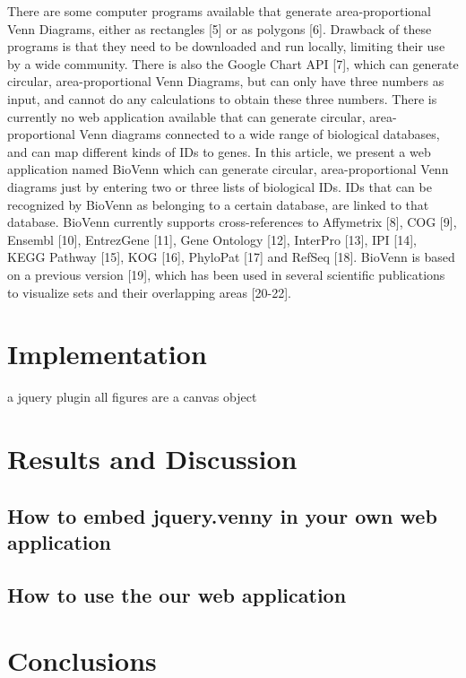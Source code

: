 \documentclass{bmcart}
\begin{document}
There are some computer programs available that generate area-proportional Venn Diagrams, either as rectangles 
[5] or as polygons [6]. Drawback of these programs is that they need to be downloaded and run locally, limiting 
their use by a wide community. There is also the Google Chart API [7], which can generate circular, area-proportional 
Venn Diagrams, but can only have three numbers as input, and cannot do any calculations to obtain these three numbers. 
There is currently no web application available that can generate circular, area-proportional Venn diagrams connected 
to a wide range of biological databases, and can map different kinds of IDs to genes. In this article, we present a 
web application named BioVenn which can generate circular, area-proportional Venn diagrams just by entering two or 
three lists of biological IDs. IDs that can be recognized by BioVenn as belonging to a certain database, are linked 
to that database. BioVenn currently supports cross-references to Affymetrix [8], COG [9], Ensembl [10], EntrezGene [11], 
Gene Ontology [12], InterPro [13], IPI [14], KEGG Pathway [15], KOG [16], PhyloPat [17] and RefSeq [18]. BioVenn is based 
on a previous version [19], which has been used in several scientific publications to visualize sets and their overlapping 
areas [20-22]. 

\section*{Implementation}
a jquery plugin 
all figures are a canvas object 

\section*{Results and Discussion}

\subsection*{How to embed jquery.venny in your own web application}

\subsection*{How to use the our web application}

\section*{Conclusions}
\end{document}
